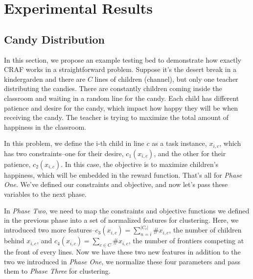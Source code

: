 \documentclass[conference]{IEEEtran}
\begin{document}



\section{Experimental Results}

\subsection{Candy Distribution}
In this section, we propose an example testing bed to demonstrate how exactly CRAF works in a straightforward problem. Suppose it's the desert break in a kindergarden and there are $C$ lines of children (channel), but only one teacher distributing the candies. There are constantly children coming inside the classroom and waiting in a random line for the candy. Each child has different patience and desire for the candy, which impact how happy they will be when receiving the candy. The teacher is trying to maximize the total amount of happiness in the classroom.

In this problem, we define the i-th child in line $c$ as a task instance, $x_{i,c}$, which has two constraints--one for their desire, $c_1(x_{i,c})$, and the other for their patience, $c_2(x_{i,c})$. In this case, the objective is to maximize children's happiness, which will be embedded in the reward function. That's all for \emph{Phase One}. We've defined our constraints and objective, and now let's pass these variables to the next phase.

In \emph{Phase Two}, we need to map the constraints and objective functions we defined in the previous phase into a set of normalized features for clustering. Here, we introduced two more features--$c_3(x_{i,c}) = \sum_{n = i}^{|C_c|}\#x_{i,c}$, the number of children behind $x_{i,c}$, and $c_4(x_{i,c}) = \sum_{c \in C}\#x_{i,c}$, the number of frontiers competing at the front of every lines. Now we have these two new features in addition to the two we introduced in \emph{Phase One}, we normalize these four parameters and pass them to \emph{Phase Three} for clustering.
\end{document}
